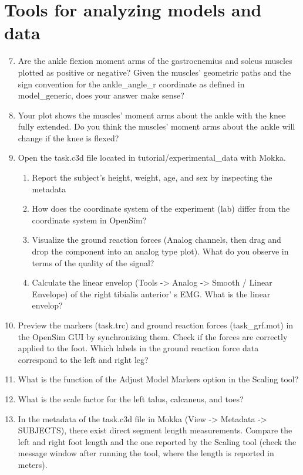\documentclass[11pt]{article}
\begin{document}
\section{Tools for analyzing models and data}

\begin{enumerate}
    \setcounter{enumi}{6}
    \item Are the ankle flexion moment arms of the gastrocnemius and soleus muscles plotted as positive or negative? Given the muscles’ geometric paths and the sign convention for the ankle\_angle\_r coordinate as defined in model\_generic, does your answer make sense?
    \item Your plot shows the muscles’ moment arms about the ankle with the knee fully extended. Do you think the muscles’ moment arms about the ankle will change if the knee is flexed?
    \item Open the task.c3d file located in tutorial/experimental\_data with Mokka.
    \begin{enumerate}
        \item Report the subject's height, weight, age, and sex by inspecting the metadata
        \item How does the coordinate system of the experiment (lab) differ from the coordinate
        system in OpenSim?
        \item Visualize the ground reaction forces (Analog channels, then drag and drop the
        component into an analog type plot). What do you observe in terms of the quality of
        the signal?
        \item Calculate the linear envelop (Tools -> Analog -> Smooth / Linear Envelope) of the right
        tibialis anterior’ s EMG. What is the linear envelop?
    \end{enumerate}
    \item Preview the markers (task.trc) and ground reaction forces (task\_grf.mot) in the OpenSim GUI
    by synchronizing them. Check if the forces are correctly applied to the foot. Which labels in the ground reaction force data correspond to the left and right leg?
    \item What is the function of the Adjust Model Markers option in the Scaling tool?
    \item What is the scale factor for the left talus, calcaneus, and toes?
    \item In the metadata of the task.c3d file in Mokka (View -> Metadata -> SUBJECTS), there exist direct segment length measurements. Compare the left and right foot length and the one reported by the Scaling tool (check the message window after running the tool, where the length is reported in meters).

\end{enumerate}
\end{document}
